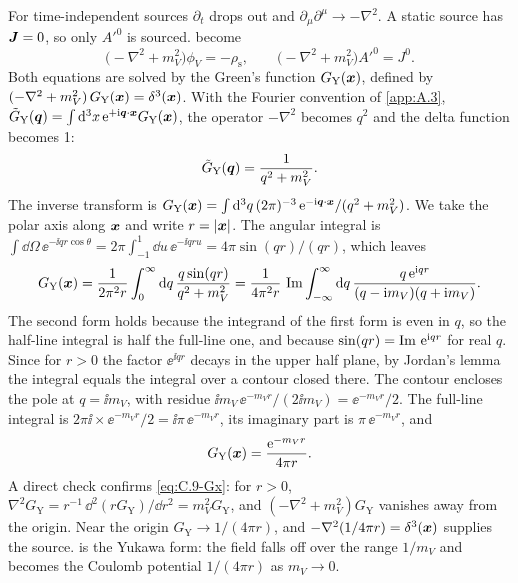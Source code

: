 For time-independent sources $\partial_t$ drops out and $\partial_\mu\partial^\mu \to -\nabla^2$. A static source has $\bm{J} = 0$, so only $A'^0$ is sourced.  become
\begin{equation}
  \bigl(-\nabla^2 + m_V^2\bigr)\phi_V = -\rho_{\mathrm{s}}, \qquad
  \bigl(-\nabla^2 + m_V^2\bigr)A'^0 = J^0 .
  \label{eq:C.9-static}
\end{equation}
Both equations are solved by the Green's function $G_{\mathrm{Y}}(\bm{x})$, defined by $(-\nabla^2 + m_V^2)\,G_{\mathrm{Y}}(\bm{x}) = \delta^3(\bm{x})$. With the Fourier convention of \cref{app:A.3}, $\tilde G_{\mathrm{Y}}(\bm{q}) = \int\mathrm{d}^3x\,\mathrm{e}^{+\mathrm{i}\bm{q}\cdot\bm{x}}G_{\mathrm{Y}}(\bm{x})$, the operator $-\nabla^2$ becomes $q^2$ and the delta function becomes 1:
\begin{equation}
  \tilde G_{\mathrm{Y}}(\bm{q}) = \frac{1}{q^2 + m_V^2} .
  \label{eq:C.9-Gq}
\end{equation}
The inverse transform is $G_{\mathrm{Y}}(\bm{x}) = \int\mathrm{d}^3q\,(2\pi)^{-3}\,\mathrm{e}^{-\mathrm{i}\bm{q}\cdot\bm{x}}/(q^2 + m_V^2)$. We take the polar axis along $\bm{x}$ and write $r = |\bm{x}|$. The angular integral is $\int\dd\Omega\,\ee^{-\ii qr\cos\theta} = 2\pi\int_{-1}^{1}\dd u\,\ee^{-\ii qru} = 4\pi\sin(qr)/(qr)$, which leaves
\begin{equation*}
  G_{\mathrm{Y}}(\bm{x}) = \frac{1}{2\pi^2 r}\int_0^\infty \mathrm{d} q\,\frac{q\sin(qr)}{q^2 + m_V^2}
  = \frac{1}{4\pi^2 r}\,\operatorname{Im}\int_{-\infty}^{\infty}\mathrm{d} q\,\frac{q\,\mathrm{e}^{\mathrm{i} qr}}{(q - \mathrm{i} m_V)(q + \mathrm{i} m_V)} .
\end{equation*}
The second form holds because the integrand of the first form is even in $q$, so the half-line integral is half the full-line one, and because $\sin(qr) = \operatorname{Im}\,\mathrm{e}^{\mathrm{i} qr}$ for real $q$. Since for $r > 0$ the factor $\ee^{\ii qr}$ decays in the upper half plane, by Jordan's lemma the integral equals the integral over a contour closed there. The contour encloses the pole at $q = \ii m_V$, with residue $\ii m_V\,\ee^{-m_V r}/(2\ii m_V) = \ee^{-m_V r}/2$. The full-line integral is $2\pi\ii \times \ee^{-m_V r}/2 = \ii\pi\,\ee^{-m_V r}$, its imaginary part is $\pi\,\ee^{-m_V r}$, and
\begin{equation}
  G_{\mathrm{Y}}(\bm{x}) = \frac{\mathrm{e}^{-m_V r}}{4\pi r} .
  \label{eq:C.9-Gx}
\end{equation}
A direct check confirms \cref{eq:C.9-Gx}: for $r > 0$, $\nabla^2 G_{\mathrm{Y}} = r^{-1}\,\dd^2(rG_{\mathrm{Y}})/\dd r^2 = m_V^2 G_{\mathrm{Y}}$, and $(-\nabla^2 + m_V^2)G_{\mathrm{Y}}$ vanishes away from the origin. Near the origin $G_{\mathrm{Y}} \to 1/(4\pi r)$, and $-\nabla^2(1/4\pi r) = \delta^3(\bm{x})$ supplies the source.  is the Yukawa form: the field falls off over the range $1/m_V$ and becomes the Coulomb potential $1/(4\pi r)$ as $m_V \to 0$.

